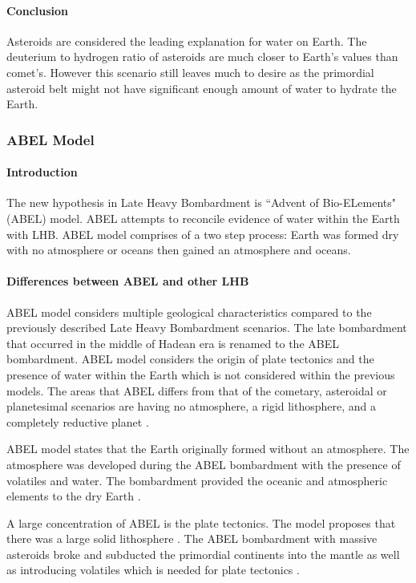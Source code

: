 \newpage
\paragraph{Conclusion}
Asteroids are considered the leading explanation for water on Earth. 
The deuterium to hydrogen ratio of asteroids are much closer to Earth's values than comet's. 
However this scenario still leaves much to desire as the primordial asteroid belt might not have significant enough amount of water to hydrate the Earth.

\subsubsection{ABEL Model}
\paragraph{Introduction}
The new hypothesis in Late Heavy Bombardment is ``Advent of Bio-ELements" (ABEL) model\cite{ABEL_1}. 
ABEL attempts to reconcile evidence of water within the Earth with LHB. ABEL model comprises of a two step process: Earth was formed dry with no atmosphere or oceans then gained an atmosphere and oceans. 

\paragraph{Differences between ABEL and other LHB}
ABEL model considers multiple geological characteristics compared to the previously described Late Heavy Bombardment scenarios. 
The late bombardment that occurred in the middle of Hadean era is renamed to the ABEL bombardment.
ABEL model considers the origin of plate tectonics and the presence of water within the Earth which is not considered within the previous models. 
The areas that ABEL differs from that of the cometary, asteroidal or planetesimal scenarios are having no atmosphere, a rigid lithosphere, and a completely reductive planet \cite{ABEL_1}.

ABEL model states that the Earth originally formed without an atmosphere. The atmosphere was developed during the ABEL bombardment with the presence of volatiles and water. The bombardment provided the oceanic and atmospheric elements to the dry Earth \cite{ABEL_2}.

A large concentration of ABEL is the plate tectonics. The model proposes that there was a large solid lithosphere \cite{ABEL_2}. The ABEL bombardment with massive asteroids broke and subducted the primordial continents into the mantle as well as  introducing volatiles which is needed for plate tectonics \cite{ABEL_3}. 

